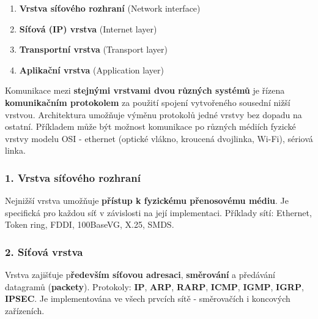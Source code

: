 \begin{enumerate}
	\item \textbf{Vrstva síťového rozhraní} (Network interface)
	\item \textbf{Síťová (IP) vrstva} (Internet layer)
	\item \textbf{Transportní vrstva} (Transport layer)
	\item \textbf{Aplikační vrstva }(Application layer)
\end{enumerate}

\noindent{}

Komunikace mezi \textbf{stejnými vrstvami dvou různých systémů} je řízena \textbf{komunikačním protokolem} za použití spojení vytvořeného sousední nižší vrstvou. Architektura umožňuje výměnu protokolů jedné vrstvy bez dopadu na ostatní. Příkladem může být možnost komunikace po různých médiích fyzické vrstvy modelu OSI - ethernet (optické vlákno, kroucená dvojlinka, Wi-Fi), sériová linka.


\subsubsection*{1. Vrstva síťového rozhraní}
Nejnižší vrstva umožňuje \textbf{přístup k fyzickému přenosovému médiu}. Je specifická pro každou síť v závislosti na její implementaci. Příklady sítí: Ethernet, Token ring, FDDI, 100BaseVG, X.25, SMDS.

\subsubsection*{2. Síťová vrstva}
Vrstva zajišťuje p\textbf{ředevším síťovou adresaci}, \textbf{směrování} a předávání datagramů (\textbf{packety}). Protokoly: \textbf{IP}, \textbf{ARP}, \textbf{RARP}, \textbf{ICMP}, \textbf{IGMP}, \textbf{IGRP}, \textbf{IPSEC}. Je implementována ve všech prvcích sítě - směrovačích i koncových zařízeních.

